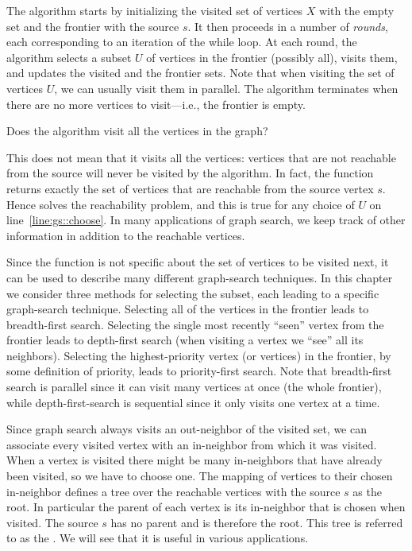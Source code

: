 The algorithm starts by initializing the visited set of vertices $X$
with the
empty set and the frontier with the source $s$.  It then proceeds in a
number of {\em rounds}, each corresponding to an iteration of
the while loop.  At each round, the algorithm selects a subset $U$ of
vertices in the frontier (possibly all), visits them, and updates the visited and the
frontier sets.   Note that when visiting the set of vertices $U$, we can
usually visit them in parallel.      
The algorithm terminates when there are no more
vertices to visit---i.e., the frontier is empty. 
%
\begin{question}
Does the algorithm visit all the vertices in the graph?
\end{question}
%
This does not mean that it visits all the vertices: vertices that are
not reachable from the source will never be visited by the algorithm.
%
In fact, the function  returns exactly the set of vertices
that are reachable from the source vertex $s$.    Hence
 solves the reachability problem, and this
is true for any choice of $U$ on line~\ref{line:gs::choose}.
%
In many applications of graph search, we keep track of other
information in addition to the reachable vertices.

Since the function  is not specific about the set of
vertices to be visited next, it can be used to describe many different
graph-search techniques.  In this chapter we  consider three methods
for selecting the subset, each leading to a specific
graph-search technique.  Selecting all of the vertices in the frontier
leads to breadth-first search.  Selecting the single most recently
``seen'' vertex from the frontier leads to depth-first search (when
visiting a vertex we ``see'' all its neighbors).  Selecting the
highest-priority vertex (or vertices) in the frontier, by some
definition of priority, leads to priority-first search.  Note that
breadth-first search is parallel since it can visit many vertices at
once (the whole frontier), while depth-first-search is sequential
since it only visits one vertex at a time.

Since graph search always visits an out-neighbor of the visited set,
we can associate every visited vertex with an in-neighbor from which
it was visited.  When a vertex is visited there might be many
in-neighbors that have already been visited, so we have to choose one.
The mapping of vertices to their chosen in-neighbor defines a tree
over the reachable vertices with the source $s$ as the root.  In
particular the parent of each vertex is its in-neighbor that is chosen
when visited.   The source $s$ has no parent and is therefore the
root.  This tree is referred to as the .  We will see that it is useful in various applications.

